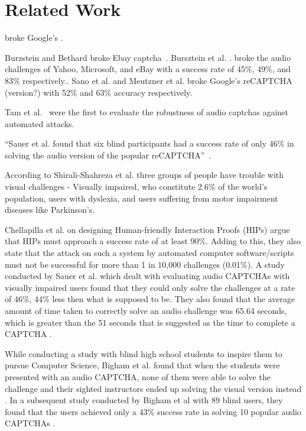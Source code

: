 \section{Related Work}
\label{sec:related}

\cite{sivakorn:eurosp16} broke Google's \re.

Burzstein and Bethard broke Ebay captcha~\cite{Bursztein2009}.
Bursztein et al. \cite{bursztein2011failure}.
broke the audio challenges of Yahoo, Microsoft, and eBay with a success rate of 45\%, 49\%, and 83\% respectively..
Sano et al. \cite{sano2013solving} and Meutzner et al. \cite{meutzner2014using} broke Google's reCAPTCHA (version?) 
with 52\% and 63\% accuracy respectively.

Tam et al.~\cite{tam2008improving} were the first to evaluate the robustness of audio captchas against automated attacks.

``Sauer et al. found that
six blind participants had a success rate of only 46\% in
solving the audio version of the popular reCAPTCHA''~\cite{sauer2008towards}.

According to Shirali-Shahreza et al. \cite{shirali2011accessibility} three groups of people
have trouble with visual challenges - Visually impaired, who constitute 2.6\% of the world's
population, users with dyslexia, and users suffering from motor impairment diseases like Parkinson's.

Chellapilla et al. \cite{Chellapilla} on designing Human-friendly Interaction Proofs (HIPs)
argue that HIPs must approach a success rate of at least 90\%. Adding to this, they also state that the
attack on such a system by automated computer software/scripts must not be successful for more than 1 in
10,000 challenges (0.01\%). A study conducted by Sauer et al. \cite{sauer2008towards} which dealt with
evaluating audio CAPTCHAs with visually impaired users found that they could only solve the challenges
at a rate of 46\%, 44\% less then what is supposed to be. They also found that the average amount of time
taken to correctly solve an audio challenge was 65.64 seconds, which is greater than the 51 seconds that
is suggested as the time to complete a CAPTCHA \cite{schluessler2007bot}.

While conducting a study with blind high school students to inspire them to pursue Computer Science, Bigham et al.
found that when the students were presented with an audio CAPTCHA, none of them were able to solve the challenge and
their sighted instructors ended up solving the visual version instead \cite{bigham2008inspiring}. In a subsequent
study conducted by Bigham et al with 89 blind users, they found that the users achieved only a 43\% success rate in
solving 10 popular audio CAPTCHAs \cite{bigham2009evaluating}. 

